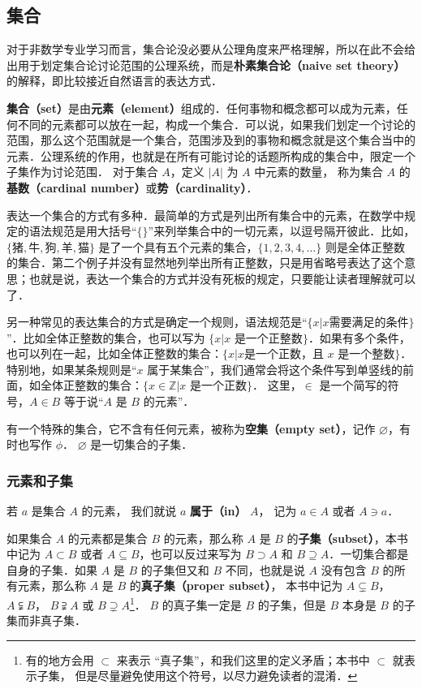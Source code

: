 

\subsection{集合}

对于非数学专业学习而言，集合论没必要从公理角度来严格理解，所以在此不会给出用于划定集合论讨论范围的公理系统，而是\textbf{朴素集合论（naive set theory）}的解释，即比较接近自然语言的表达方式．

\textbf{集合（set）}是由\textbf{元素（element）}组成的．任何事物和概念都可以成为元素，任何不同的元素都可以放在一起，构成一个集合．可以说，如果我们划定一个讨论的范围，那么这个范围就是一个集合，范围涉及到的事物和概念就是这个集合当中的元素．公理系统的作用，也就是在所有可能讨论的话题所构成的集合中，限定一个子集作为讨论范围． 对于集合 $A$，定义 $|A|$ 为 $A$ 中元素的数量， 称为集合 $A$ 的\textbf{基数（cardinal number）}或\textbf{势（cardinality）}．

表达一个集合的方式有多种．最简单的方式是列出所有集合中的元素，在数学中规定的语法规范是用大括号“$\{\}$”来列举集合中的一切元素，以逗号隔开彼此．比如，$\{\text{猪}, \text{牛}, \text{狗}, \text{羊}, \text{猫}\}$ 是了一个具有五个元素的集合，$\{1,2,3,4,\dots\}$ 则是全体正整数的集合．第二个例子并没有显然地列举出所有正整数，只是用省略号表达了这个意思；也就是说，表达一个集合的方式并没有死板的规定，只要能让读者理解就可以了．

另一种常见的表达集合的方式是确定一个规则，语法规范是“$\{x|x \text{需要满足的条件}\}$”．比如全体正整数的集合，也可以写为 $\{x|\text{$x$ 是一个正整数}\}$．如果有多个条件，也可以列在一起，比如全体正整数的集合：$\{x|x \text{是一个正数，且 $x$ 是一个整数}\}$．特别地，如果某条规则是“$x$ 属于某集合”，我们通常会将这个条件写到单竖线的前面，如全体正整数的集合：$\{x\in\mathbb{Z}|\text{$x$ 是一个正数}\}$． 这里，$\in$ 是一个简写的符号，$A\in B$ 等于说“$A$ 是 $B$ 的元素”．

有一个特殊的集合，它不含有任何元素，被称为\textbf{空集（empty set）}，记作 $\varnothing$，有时也写作 $\phi$． $\varnothing$ 是一切集合的子集．

\subsubsection{元素和子集}
若 $a$ 是集合 $A$ 的元素， 我们就说 $a$ \textbf{属于（in）} $A$， 记为 $a \in A$ 或者 $A \ni a$．

如果集合 $A$ 的元素都是集合 $B$ 的元素，那么称 $A$ 是 $B$ 的\textbf{子集（subset）}，本书中记为 $A\subset B$ 或者 $A\subseteq B$，也可以反过来写为 $B\supset A$ 和 $B\supseteq A$．一切集合都是自身的子集．如果 $A$ 是 $B$ 的子集但又和 $B$ 不同，也就是说 $A$ 没有包含 $B$ 的所有元素，那么称 $A$ 是 $B$ 的\textbf{真子集（proper subset）}， 本书中记为 $A\subsetneq B$， $A\subsetneqq B$， $B\supsetneqq A$ 或 $B\supsetneq A$\footnote{有的地方会用 $\subset$ 来表示 “真子集”，和我们这里的定义矛盾；本书中 $\subset$ 就表示子集， 但是尽量避免使用这个符号，以尽力避免读者的混淆．}． $B$ 的真子集一定是 $B$ 的子集，但是 $B$ 本身是 $B$ 的子集而非真子集．

